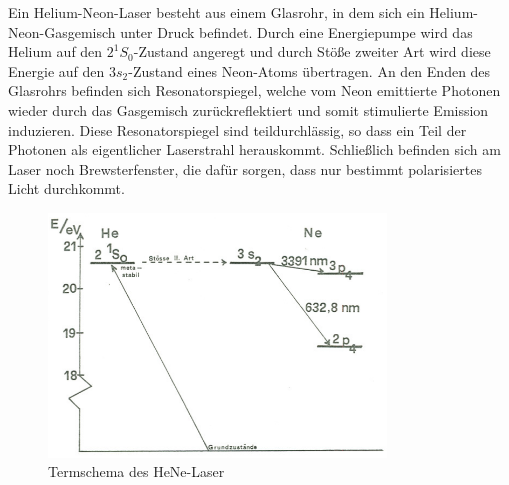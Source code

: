 Ein Helium-Neon-Laser besteht aus einem Glasrohr, in dem sich ein Helium-Neon-Gasgemisch unter Druck befindet. Durch eine Energiepumpe wird das Helium auf den $2^1 S_0$-Zustand angeregt und durch Stöße zweiter Art wird diese Energie auf den $3 s_2$-Zustand eines Neon-Atoms übertragen. An den Enden des Glasrohrs befinden sich Resonatorspiegel, welche vom Neon emittierte Photonen wieder durch das Gasgemisch zurückreflektiert und somit stimulierte Emission induzieren. Diese Resonatorspiegel sind teildurchlässig, so dass ein Teil der Photonen als eigentlicher Laserstrahl herauskommt. Schließlich befinden sich am Laser noch Brewsterfenster, die dafür sorgen, dass nur bestimmt polarisiertes Licht durchkommt.

\begin{figure}[H]
	\centering \includegraphics[width = 0.8\textwidth]{Bilder/henelaser.jpg}
	\caption{Termschema des HeNe-Laser}
\end{figure}

\clearpage

























